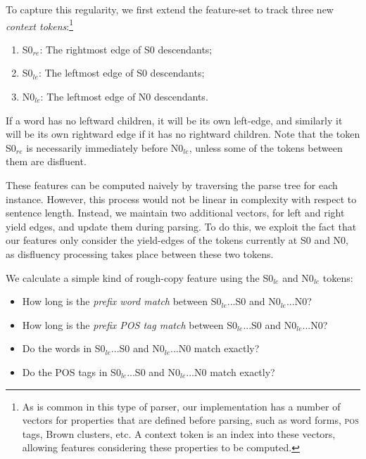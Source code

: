 \documentclass[11pt,letterpaper]{article}
\newcommand{\szero}{S0\xspace}
\newcommand{\nzero}{N0\xspace}
\newcommand{\szeroRedge}{S0$_{re}$\xspace}
\newcommand{\szeroLedge}{S0$_{le}$\xspace}
\newcommand{\nzeroLedge}{N0$_{le}$\xspace}
\begin{document}
To capture this regularity, we first extend the feature-set to track three new
\emph{context tokens}:\footnote{As is common
in this type of parser, our implementation has a number of vectors for properties
that are defined before parsing, such as word forms, \textsc{pos} tags, Brown
clusters, etc. A context token is an index into these vectors, allowing
features considering these properties to be computed.}
\begin{enumerate}
    \itemsep0em
    \item \szeroRedge : The rightmost edge of \szero  descendants;
    \item \szeroLedge : The leftmost edge of \szero  descendants;
    \item \nzeroLedge : The leftmost edge of \nzero  descendants.
\end{enumerate}

If a word has
no leftward children, it will be its own left-edge, and similarly it will be
its own rightward edge if it has no rightward children. Note that the token
\szeroRedge is necessarily immediately before \nzeroLedge, unless some of the
tokens between them are disfluent.

These features can be computed naively by traversing the parse tree for each
instance. However, this process would not be linear in complexity with respect
to sentence length.  Instead, we maintain two additional vectors, for left
and right yield edges, and update them during parsing.  To do this, we exploit
the fact that our features only consider the yield-edges of the tokens currently
at S0 and N0, as disfluency processing takes place between these two tokens.

We calculate a simple kind of rough-copy feature using the \szeroLedge and
\nzeroLedge tokens:

\begin{itemize}
    \itemsep0em
    \item How long is the \emph{prefix word match} between \szeroLedge...\szero
          and \nzeroLedge...\nzero?
    \item How long is the \emph{prefix POS tag match} between \szeroLedge...\szero
          and \nzeroLedge...\nzero?
    \item Do the words in \szeroLedge...\szero and \nzeroLedge...\nzero match
          exactly?
    \item Do the POS tags in \szeroLedge...\szero and \nzeroLedge...\nzero match
          exactly?
\end{itemize}
\end{document}
